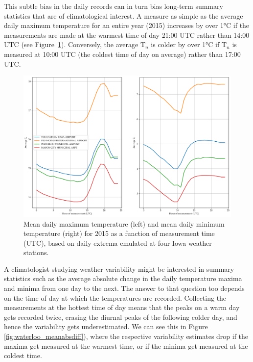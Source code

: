 \documentclass[letter]{article}
\makeatletter
\def\maxwidth{\ifdim\Gin@nat@width>\linewidth\linewidth
\else\Gin@nat@width\fi}
\let\Oldincludegraphics\includegraphics
\renewcommand{\includegraphics}[1]{\Oldincludegraphics[width=.8\maxwidth]{#1}}
\newcommand{\T}{\mathrm{T}}
\newcommand{\Tn}{\T_{n}}
\makeatother
\begin{document}
        This subtle bias in the daily records can in turn bias long-term summary statistics that are of climatological interest.
A measure as simple as the average daily maximum temperature for an entire year (2015) increases by over 1°C if the measurements are made at the warmest time of day 21:00 UTC rather than 14:00 UTC (see Figure~\ref{fig:waterloo_avgTnTx}).
Conversely, the average \(\Tn\) is colder by over 1°C if \(\Tn\) is measured at 10:00 UTC (the coldest time of day on average) rather than 17:00 UTC.

\begin{figure}
\centering
\includegraphics{../figures/waterloo_avgTnTx.png}
\caption{\label{fig:waterloo_avgTnTx}
Mean daily maximum temperature (left)
and mean daily minimum temperature (right)
for 2015 as a function of measurement time (UTC),
based on daily extrema emulated at four Iowa weather stations.}
\end{figure}
    


        A climatologist studying weather variability might be interested in summary statistics such as the average absolute change in the daily temperature maxima and minima from one day to the next.
The answer to that question too depends on the time of day at which the temperatures are recorded.
Collecting the measurements at the hottest time of day means that the peaks on a warm day gets recorded twice,
erasing the diurnal peaks of the following colder day,
and hence the variability gets underestimated.
We can see this in Figure \ref{fig:waterloo_meanabsdiff}), where the respective variability estimates drop if the maxima get measured at the warmest time, or if the minima get measured at the coldest time.
\end{document}
